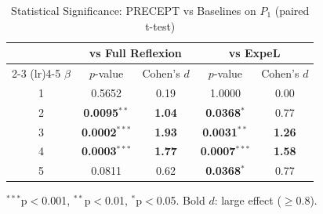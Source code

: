 \begin{table}[t]
\centering
\caption{Statistical Significance: PRECEPT vs Baselines on $P_1$ (paired t-test)}
\label{tab:exp3_significance}
\begin{tabular}{c cc cc}
\toprule
& \multicolumn{2}{c}{\textbf{vs Full Reflexion}} & \multicolumn{2}{c}{\textbf{vs ExpeL}} \\
\cmidrule(lr){2-3} \cmidrule(lr){4-5}
$\beta$ & $p$-value & Cohen's $d$ & $p$-value & Cohen's $d$ \\
\midrule
1 & 0.5652 & 0.19 & 1.0000 & 0.00 \\
2 & \textbf{0.0095}$^{**}$ & \textbf{1.04} & \textbf{0.0368}$^{*}$ & 0.77 \\
3 & \textbf{0.0002}$^{***}$ & \textbf{1.93} & \textbf{0.0031}$^{**}$ & \textbf{1.26} \\
4 & \textbf{0.0003}$^{***}$ & \textbf{1.77} & \textbf{0.0007}$^{***}$ & \textbf{1.58} \\
5 & 0.0811 & 0.62 & \textbf{0.0368}$^{*}$ & 0.77 \\
\bottomrule
\end{tabular}
\vspace{2mm}
\footnotesize
$^{***}$p$<$0.001, $^{**}$p$<$0.01, $^{*}$p$<$0.05. Bold $d$: large effect ($\geq$0.8).
\end{table}
